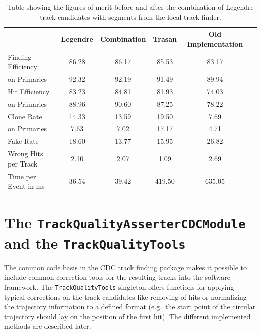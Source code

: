\begin{table}
  \caption{Table showing the figures of merit before and after the combination of Legendre track candidates with segments from the local track finder.}
  \centering
  \begin{tabular}{lccccc} \toprule
    & Legendre & Combination & Trasan & Old Implementation \\ \midrule
    Finding Efficiency   & 86.28 & 86.17 & 85.53 & 83.17 \\
    \quad on Primaries   & 92.32 & 92.19 & 91.49 & 89.94 \\ 
    Hit Efficiency       & 83.23 & 84.81 & 81.93 & 74.03 \\
    \quad on Primaries   & 88.96 & 90.60 & 87.25 & 78.22 \\ 
    Clone Rate           & 14.33 & 13.59 & 19.50 & 7.69 \\
    \quad on Primaries   & 7.63  & 7.02  & 17.17 & 4.71 \\ 
    Fake Rate            & 18.60 & 13.77 & 15.95 & 26.82 \\ 
    Wrong Hits per Track & 2.10  & 2.07  & 1.09  & 2.69 \\ 
    Time per Event in ms & 36.54 & 39.42 & 419.50& 635.05 \\ \bottomrule
  \end{tabular}
  \label{tab-segment-track-combiner-fom}
\end{table}

\section{The \texttt{Track\-Quality\-Asserter\-CDC\-Module} and the \texttt{Track\-Quality\-Tools}}  \label{section-quality}

The common code basis in the CDC track finding package makes it possible to include common correction tools for the resulting tracks into the software framework. The \texttt{TrackQualityTools} singleton offers functions for applying typical corrections on the track candidates like removing of hits or normalizing the trajectory information to a defined format (e.g.\ the start point of the circular trajectory should lay on the position of the first hit). The different implemented methods are described later.

